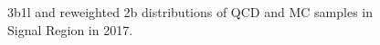 \begin{figure}[ht]
 

    \caption{3b1l and reweighted 2b distributions of QCD and \ttbar MC samples in Signal Region in 2017.}
    \label{fig:data-weights-3b1l-SR-2017}
\end{figure}


